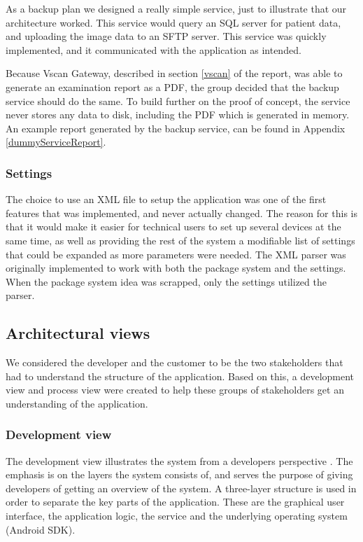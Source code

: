 As a backup plan we designed a really simple service, just to illustrate that our architecture worked. This service would query an SQL server for patient data, and uploading the image data to an SFTP server. This service was quickly implemented, and it communicated with the application as intended.

\noindent
Because Vscan Gateway, described in section \ref{vscan} of the report, was able to generate an examination report as a PDF, the group decided that the backup service should do the same. To build further on the proof of concept, the service never stores any data to disk, including the PDF which is generated in memory. An example report generated by the backup service, can be found in Appendix \ref{dummyServiceReport}.


\subsubsection{Settings}
The choice to use an XML file to setup the application was one of the first features that was implemented, and never actually changed. The reason for this is that it would make it easier for technical users to set up several devices at the same time, as well as providing the rest of the system a modifiable list of settings that could be expanded as more parameters were needed. The XML parser was originally implemented to work with both the package system and the settings. When the package system idea was scrapped, only the settings utilized the parser.




\subsection{Architectural views}
We considered the developer and the customer to be the two stakeholders that had to understand the structure of the application. Based on this, a development view and process view were created to help these groups of stakeholders get an understanding of the application.


\newpage

\subsubsection{Development view}
The development view illustrates the system from a developers perspective \cite{softwarearchitecture}. The emphasis is on the layers the system consists of, and serves the purpose of giving developers of getting an overview of the system. A three-layer structure is used in order to separate the key parts of the application. These are the graphical user interface, the application logic, the service and the underlying operating system (Android SDK).

